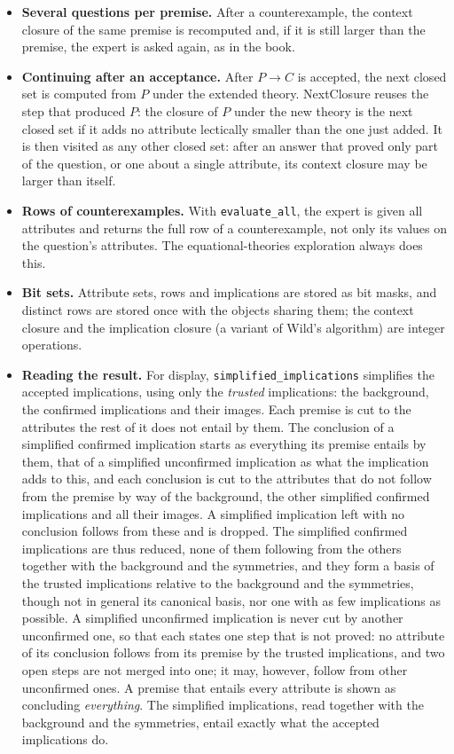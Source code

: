 \documentclass[11pt,a4paper]{article}
\theoremstyle{definition}
\theoremstyle{remark}
\newcommand{\code}[1]{\texttt{#1}}
\begin{document}
\begin{itemize}
  \item \textbf{Several questions per premise.} After a counterexample, the context closure of the same premise is recomputed and, if it is still larger than the premise, the expert is asked again, as in the book.
  \item \textbf{Continuing after an acceptance.} After $P \to C$ is accepted, the next closed set is computed from $P$ under the extended theory. NextClosure reuses the step that produced $P$: the closure of $P$ under the new theory is the next closed set if it adds no attribute lectically smaller than the one just added. It is then visited as any other closed set: after an answer that proved only part of the question, or one about a single attribute, its context closure may be larger than itself.
  \item \textbf{Rows of counterexamples.} With \code{evaluate\_all}, the expert is given all attributes and returns the full row of a counterexample, not only its values on the question's attributes. The equational-theories exploration always does this.
  \item \textbf{Bit sets.} Attribute sets, rows and implications are stored as bit masks, and distinct rows are stored once with the objects sharing them; the context closure and the implication closure (a variant of Wild's algorithm) are integer operations.
  \item \textbf{Reading the result.} For display, \code{simplified\_implications} simplifies the accepted implications, using only the \emph{trusted} implications: the background, the confirmed implications and their images. Each premise is cut to the attributes the rest of it does not entail by them. The conclusion of a simplified confirmed implication starts as everything its premise entails by them, that of a simplified unconfirmed implication as what the implication adds to this, and each conclusion is cut to the attributes that do not follow from the premise by way of the background, the other simplified confirmed implications and all their images. A simplified implication left with no conclusion follows from these and is dropped. The simplified confirmed implications are thus reduced, none of them following from the others together with the background and the symmetries, and they form a basis of the trusted implications relative to the background and the symmetries, though not in general its canonical basis, nor one with as few implications as possible. A simplified unconfirmed implication is never cut by another unconfirmed one, so that each states one step that is not proved: no attribute of its conclusion follows from its premise by the trusted implications, and two open steps are not merged into one; it may, however, follow from other unconfirmed ones. A premise that entails every attribute is shown as concluding \emph{everything}. The simplified implications, read together with the background and the symmetries, entail exactly what the accepted implications do.
\end{itemize}
\end{document}
